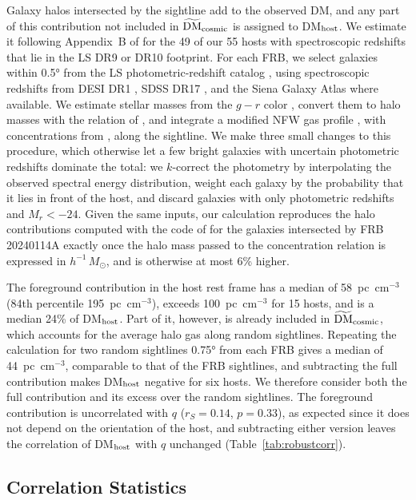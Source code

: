 \documentclass[apjl, linenumbers]{aastex701}
\begin{document}
Galaxy halos intersected by the sightline add to the observed DM, and any part
of this contribution not included in $\widetilde{\rm DM}_{\rm cosmic}$ is
assigned to DM$_{\rm host}$. We estimate it following Appendix~B of
\citet{Bhardwaj2025} for the 49 of our 55 hosts with spectroscopic redshifts
that lie in the LS DR9 or DR10 footprint. For each FRB, we select galaxies
within \ang{0.5} from the LS photometric-redshift catalog
\citep{Dey2019, Zhou2021}, using spectroscopic redshifts from DESI DR1
\citep{DESIDR1}, SDSS DR17 \citep{Abdurrouf2022}, and the Siena Galaxy Atlas
\citep{Moustakas2023} where available. We estimate stellar masses from the
$g-r$ color \citep{Bell2003}, convert them to halo masses with the relation of
\citet{Moster2013}, and integrate a modified NFW gas profile
\citep{ProchaskaZheng2019}, with concentrations from \citet{Dutton2014}, along the
sightline. We make three small changes to this procedure, which otherwise let a
few bright galaxies with uncertain photometric redshifts dominate the total: we
$k$-correct the photometry by interpolating the observed spectral energy
distribution, weight each galaxy by the probability that it lies in front of
the host, and discard galaxies with only photometric redshifts and
$M_r < -24$. Given the same inputs, our calculation reproduces the halo
contributions computed with the code of \citet{Bhardwaj2025} for the galaxies
intersected by FRB 20240114A exactly once the halo mass passed to the
concentration relation is expressed in $h^{-1}\,M_\odot$, and is otherwise
at most 6\% higher.

The foreground contribution in the host rest frame has a median of
58~pc~cm$^{-3}$ (84th percentile 195~pc~cm$^{-3}$), exceeds 100~pc~cm$^{-3}$ for
15 hosts, and is a median 24\% of DM$_{\rm host}$. Part of it, however, is
already included in $\widetilde{\rm DM}_{\rm cosmic}$, which accounts for the
average halo gas along random sightlines. Repeating the calculation for two
random sightlines \ang{0.75} from each FRB gives a median of 44~pc~cm$^{-3}$,
comparable to that of the FRB sightlines, and subtracting the full
contribution makes DM$_{\rm host}$ negative for six hosts. We therefore
consider both the full contribution and its excess over the random
sightlines. The foreground
contribution is uncorrelated with $q$ ($r_S = 0.14$, $p = 0.33$), as expected
since it does not depend on the orientation of the host, and subtracting
either version leaves the correlation of DM$_{\rm host}$ with $q$ unchanged
(Table~\ref{tab:robustcorr}).

\subsection{Correlation Statistics} \label{app:stats}
\end{document}
